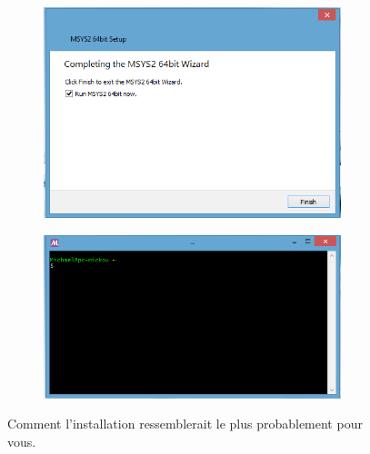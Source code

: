 \documentclass{article}
\begin{document}
\begin{figure}[H]
\begin{subfigure}[c]{0.5\textwidth}
\includegraphics[width=0.95\textwidth]{Plots/Msys2_5.png}
\end{subfigure}
\begin{subfigure}[c]{0.5\textwidth}
\includegraphics[width=0.95\textwidth]{Plots/Msys2_6Terminal.png}
\end{subfigure}
\caption{Comment l'installation ressemblerait le plus probablement pour vous.\label{F:installationMsys2}}
\end{figure}
\end{document}
